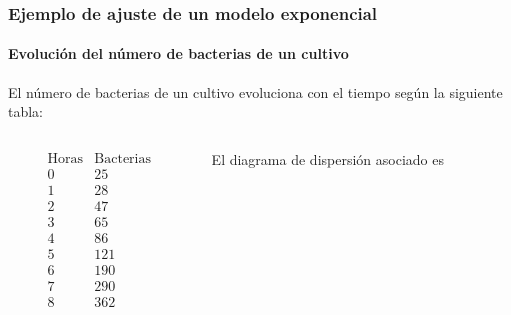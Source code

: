 \begin{frame}
\frametitle{Ejemplo de ajuste de un modelo exponencial}
\framesubtitle{Evolución del número de bacterias de un cultivo}
El número de bacterias de un cultivo evoluciona con el tiempo según la siguiente tabla:
\begin{columns}
\begin{column}{0.3\textwidth}
\[
\begin{array}{c|c}
\mbox{Horas} & \mbox{Bacterias}\\
\hline
0 &  25 \\
1 & 28 \\
2 &  47\\
3 & 65 \\
4 & 86\\
5 & 121\\
6 & 190\\
7 & 290\\
8 & 362
\end{array}
\]
\end{column}
\begin{column}{0.6\textwidth}
El diagrama de dispersión asociado es
\begin{center}
\scalebox{0.6}{}
\end{center}
\end{column}
\end{columns}

\end{frame}


